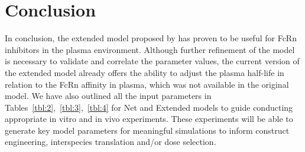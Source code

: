 \documentclass[fleqn,10pt]{physiome}
\begin{document}

\section{Conclusion}

In conclusion, the extended model proposed by \cite{de2023mechanistic} has proven to be useful for FcRn inhibitors in the plasma environment. Although further refinement of the model is necessary to validate and correlate the parameter values, the current version of the extended model already offers the ability to adjust the plasma half-life in relation to the FcRn affinity in plasma, which was not available in the original model. We have also outlined all the input parameters in Tables~\ref{tbl:2},~\ref{tbl:3},~\ref{tbl:4} for Net and Extended models to guide conducting appropriate in vitro and in vivo experiments. These experiments will be able to generate key model parameters for meaningful simulations to inform construct engineering, interspecies translation and/or dose selection.
\end{document}
